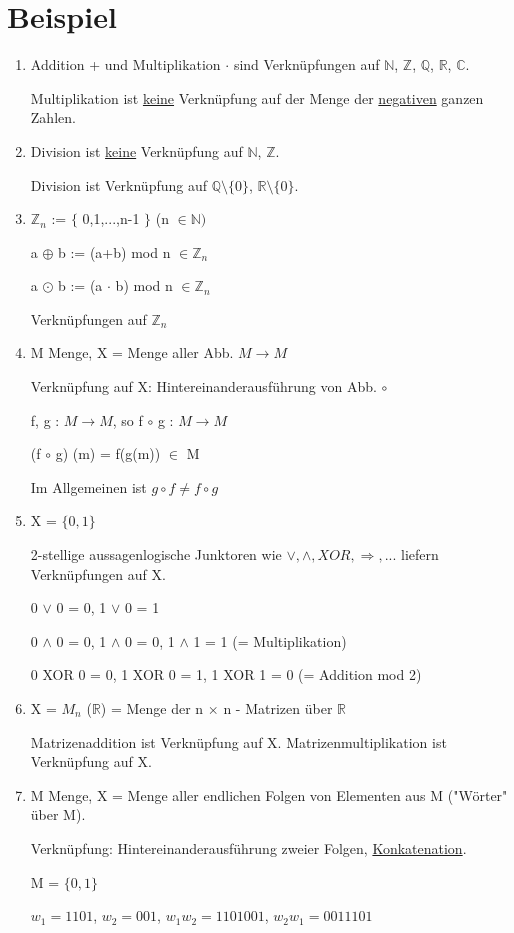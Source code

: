 \documentclass[a4paper, openany]{book}
\begin{document}
\section{Beispiel}
\begin{enumerate}[label=(\alph*)]
  \item Addition + und Multiplikation $\cdot$ sind Verknüpfungen auf $\mathbb{N}$, $\mathbb{Z}$, $\mathbb{Q}$, $\mathbb{R}$, $\mathbb{C}$.
  
  Multiplikation ist \underline{keine} Verknüpfung auf der Menge der \underline{negativen} ganzen Zahlen.
  
  \item Division ist \underline{keine} Verknüpfung auf $\mathbb{N}$, $\mathbb{Z}$.
  
  Division ist Verknüpfung auf $\mathbb{Q} \setminus \lbrace 0 \rbrace$, $\mathbb{R} \setminus \lbrace 0 \rbrace$.
  
  \item $\mathbb{Z}_n$ := $\lbrace$ 0,1,...,n-1 $\rbrace$ (n $\in \mathbb{N})$
  
  a $\oplus$ b := (a+b) mod n $\in \mathbb{Z}_n$
  
  a $\odot$ b := (a $\cdot$ b) mod n $\in \mathbb{Z}_n$
  
  Verknüpfungen auf $\mathbb{Z}_n$
  
  \item M Menge, X = Menge aller Abb. $M \rightarrow M$
  
  Verknüpfung auf X: Hintereinanderausführung von Abb. $\circ$
  
  f, g : $M \rightarrow M$, so f $\circ$ g : $M \rightarrow M$

  (f $\circ$ g) (m) = f(g(m)) $\in$ M
  
  Im Allgemeinen ist $g \circ f \neq f \circ g$
  
  \item X = $\lbrace 0, 1 \rbrace$
  
  2-stellige aussagenlogische Junktoren wie $\vee, \wedge, XOR, \Rightarrow, ...$ liefern Verknüpfungen auf X.
  
  0 $\vee$ 0 = 0, 1 $\vee$ 0 = 1 
  
  0 $\wedge$ 0 = 0, 1 $\wedge$ 0 = 0, 1 $\wedge$ 1 = 1 (= Multiplikation)
  
  0 XOR 0 = 0, 1 XOR 0 = 1, 1 XOR 1 = 0 (= Addition mod 2)
  
  \item X = $M_n$ ($\mathbb{R}$) = Menge der n $\times$ n - Matrizen über $\mathbb{R}$
  
  Matrizenaddition ist Verknüpfung auf X. Matrizenmultiplikation ist Verknüpfung auf X.
  
  \item M Menge, X = Menge aller endlichen Folgen von Elementen aus M ("Wörter" über M).
  
  Verknüpfung: Hintereinanderausführung zweier Folgen, \underline{Konkatenation}.
  
  M = $\lbrace 0, 1 \rbrace$
  
  $w_1 = 1101$, $w_2 = 001$, $w_1w_2=1101001$, $w_2w_1 = 0011101$
\end{enumerate}
\end{document}
